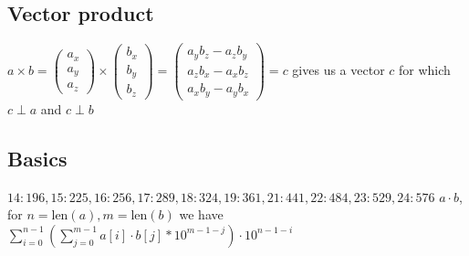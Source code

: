 \vspace{-1.5pc}
\subsection{Vector product}
$a \times b = \begin{pmatrix}a_x\\a_y\\a_z\end{pmatrix} \times \begin{pmatrix}b_x\\b_y\\b_z\end{pmatrix} =
    \begin{pmatrix}
        a_y b_z - a_z b_y \\
        a_z b_x - a_x b_z \\
        a_x b_y - a_y b_x
    \end{pmatrix} = c$
gives us a vector $c$ for which $c \perp a$ and $c \perp b$


\vspace{-0.5pc}
\subsection{Basics}
 $14: 196, 15: 225, 16: 256, 17: 289, 18: 324, 19: 361, 21: 441, 22: 484, 23: 529, 24: 576$
 $a \cdot b$, for $n = \text{len}(a), m = \text{len}(b)$ we have $\displaystyle\sum_{i = 0}^{n - 1} \left(\sum_{j = 0}^{m - 1} a[i] \cdot b[j] * 10^{m - 1  - j}\right) \cdot 10^{n - 1 - i}$


\vspace{-0.5pc}
